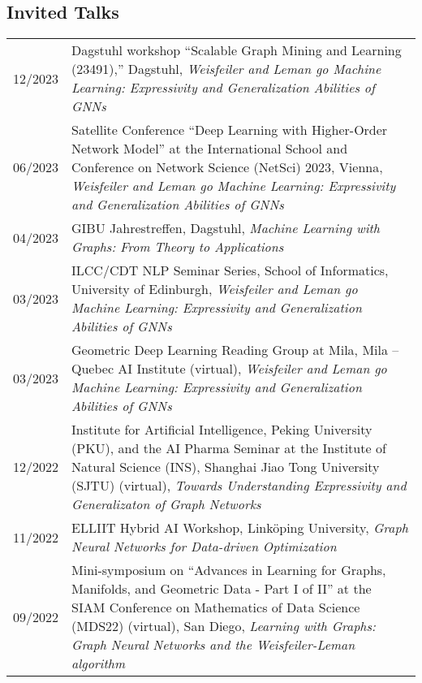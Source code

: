 \documentclass[11pt, a4paper, DIV=12]{scrartcl}
\begin{document}
\subsection*{Invited Talks}
\begin{longtabu}{p{2.1cm}p{12.0cm}}
	
	12/2023 & Dagstuhl workshop ``Scalable Graph Mining and Learning (23491),'' Dagstuhl, \emph{Weisfeiler and Leman go Machine Learning: Expressivity and Generalization Abilities of GNNs}                                                                                                \\
	06/2023 & Satellite Conference ``Deep Learning with Higher-Order Network Model'' at the International School
	and Conference on Network Science (NetSci) 2023, Vienna, \emph{Weisfeiler and Leman go Machine Learning: Expressivity and Generalization Abilities of GNNs}                                                                                                                             \\
	04/2023 & GIBU Jahrestreffen, Dagstuhl, \emph{Machine Learning with Graphs: From Theory to Applications}                                                                                                                                                                                \\
	03/2023 & ILCC/CDT NLP Seminar Series, School of Informatics, University of Edinburgh, \emph{Weisfeiler and Leman go Machine Learning: Expressivity and Generalization Abilities of GNNs}\\
	03/2023 & Geometric Deep Learning Reading Group at Mila, Mila -- Quebec AI Institute (virtual), \emph{Weisfeiler and Leman go Machine Learning: Expressivity and Generalization Abilities of GNNs}\\
	12/2022 & Institute for Artificial Intelligence, Peking University (PKU), and the AI Pharma Seminar at the Institute of Natural Science (INS), Shanghai Jiao Tong University (SJTU) (virtual), \emph{Towards Understanding Expressivity and Generalizaton of Graph Networks}            \\
	11/2022 & ELLIIT Hybrid AI Workshop, Linköping University, \emph{Graph Neural Networks for Data-driven Optimization}                                                                                                                                                                    \\
	09/2022 & Mini-symposium on ``Advances in Learning for Graphs, Manifolds, and Geometric Data - Part I of II'' at the SIAM Conference on Mathematics of Data Science (MDS22) (virtual), San Diego, \emph{Learning with Graphs: Graph Neural Networks and the Weisfeiler-Leman algorithm} \\

\end{longtabu}
\end{document}
